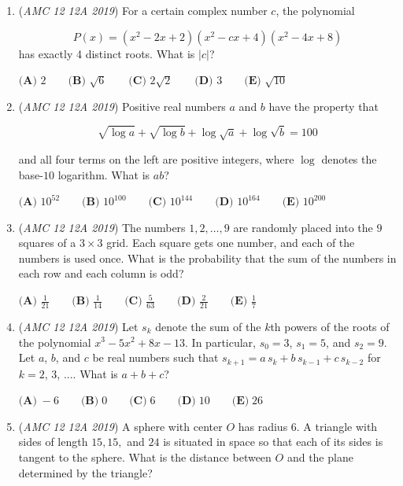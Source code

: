 \begin{enumerate}
 $\textbf{(A)}\ 144\qquad\textbf{(B)}\ 216\qquad\textbf{(C)}\ 256\qquad\textbf{(D)}\ 384\qquad\textbf{(E)}\ 432$


	\item (\textit{AMC 12 12A 2019}) For a certain complex number $c$, the polynomial

 \[P(x) = (x^2 - 2x + 2)(x^2 - cx + 4)(x^2 - 4x + 8)\]has exactly 4 distinct roots. What is $|c|$?


 $\textbf{(A) } 2 \qquad \textbf{(B) } \sqrt{6} \qquad \textbf{(C) } 2\sqrt{2} \qquad \textbf{(D) } 3 \qquad \textbf{(E) } \sqrt{10}$


	\item (\textit{AMC 12 12A 2019}) Positive real numbers $a$ and $b$ have the property that

 \[\sqrt{\log{a}} + \sqrt{\log{b}} + \log \sqrt{a} + \log \sqrt{b} = 100\]


 and all four terms on the left are positive integers, where $\log$ denotes the base-$10$ logarithm. What is $ab$?


 $\textbf{(A) }   10^{52}   \qquad        \textbf{(B) }   10^{100}   \qquad    \textbf{(C) }   10^{144}   \qquad   \textbf{(D) }  10^{164} \qquad  \textbf{(E) }   10^{200}$


	\item (\textit{AMC 12 12A 2019}) The numbers $1,2,\dots,9$ are randomly placed into the $9$ squares of a $3 \times 3$ grid. Each square gets one number, and each of the numbers is used once. What is the probability that the sum of the numbers in each row and each column is odd?


 $\textbf{(A) }\frac{1}{21}\qquad\textbf{(B) }\frac{1}{14}\qquad\textbf{(C) }\frac{5}{63}\qquad\textbf{(D) }\frac{2}{21}\qquad\textbf{(E) } \frac17$


	\item (\textit{AMC 12 12A 2019}) Let $s_k$ denote the sum of the $\textit{k}$th powers of the roots of the polynomial $x^3-5x^2+8x-13$. In particular, $s_0=3$, $s_1=5$, and $s_2=9$. Let $a$, $b$, and $c$ be real numbers such that $s_{k+1} = a \, s_k + b \, s_{k-1} + c \, s_{k-2}$ for $k = 2$, $3$, $....$ What is $a+b+c$?


 $\textbf{(A)} \; -6 \qquad \textbf{(B)} \; 0 \qquad \textbf{(C)} \; 6 \qquad \textbf{(D)} \; 10 \qquad \textbf{(E)} \; 26$


	\item (\textit{AMC 12 12A 2019}) A sphere with center $O$ has radius $6$. A triangle with sides of length $15, 15,$ and $24$ is situated in space so that each of its sides is tangent to the sphere. What is the distance between $O$ and the plane determined by the triangle?



\end{enumerate}
